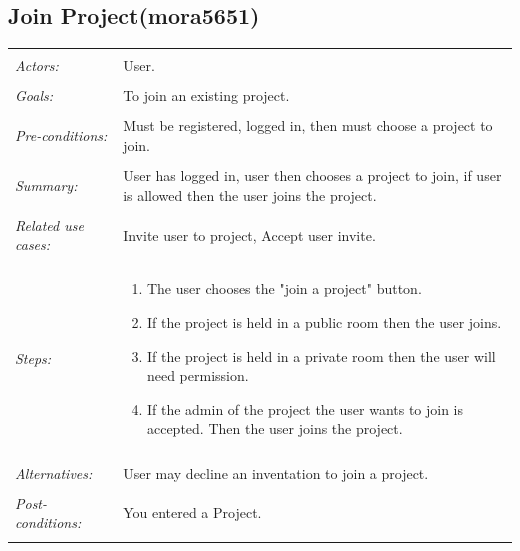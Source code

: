 \documentclass[11pt]{report}
\begin{document}
\subsection{Join Project(mora5651)}
\begin{tabular}{ p{2cm} p{12cm} }
\hline
\\
\textit{Actors:} & User.\\
\\
\textit{Goals:} & To join an existing project.\\
\\
\textit{Pre-conditions:} & Must be registered, logged in, then must choose a project to join.\\
\\
\textit{Summary:} & User has logged in, user then chooses a project to join, if user is allowed then the user joins the project. \\
\\
\textit{Related use cases:} & Invite user to project, Accept user invite. \\
\\
\textit{Steps:} & \begin{enumerate}
 \item The user chooses the "join a project" button. 
 \item If the project is held in a public room then the user joins. 
 \item If the project is held in a private room then the user will need permission. 
 \item If the admin of the project the user wants to join is accepted. Then the user joins the project. 
\end{enumerate}\\
\\
\textit{Alternatives:} & User may decline an inventation to join a project. \\
\\
\textit{Post-conditions:} & You entered a Project. \\
\\
\hline
\end{tabular}
\end{document}
